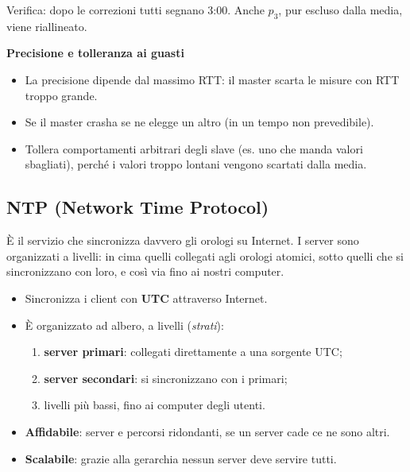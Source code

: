 Verifica: dopo le correzioni tutti segnano 3:00. Anche \(p_3\), pur escluso dalla media, viene riallineato.

\textbf{Precisione e tolleranza ai guasti}

\begin{itemize}
\tightlist
\item
  La precisione dipende dal massimo RTT: il master scarta le misure con RTT troppo grande.
\item
  Se il master crasha se ne elegge un altro (in un tempo non prevedibile).
\item
  Tollera comportamenti arbitrari degli slave (es. uno che manda valori sbagliati), perché i valori troppo lontani vengono scartati dalla media.
\end{itemize}

\subsection{NTP (Network Time Protocol)}

\begin{inbreve}

È il servizio che sincronizza davvero gli orologi su Internet. I server sono organizzati a livelli: in cima quelli collegati agli orologi atomici, sotto quelli che si sincronizzano con loro, e così via fino ai nostri computer.

\end{inbreve}

\begin{itemize}
\tightlist
\item
  Sincronizza i client con \textbf{UTC} attraverso Internet.
\item
  È organizzato ad albero, a livelli (\emph{strati}):

  \begin{enumerate}
  \def\labelenumi{\arabic{enumi}.}
  \tightlist
  \item
    \textbf{server primari}: collegati direttamente a una sorgente UTC;
  \item
    \textbf{server secondari}: si sincronizzano con i primari;
  \item
    livelli più bassi, fino ai computer degli utenti.
  \end{enumerate}
\item
  \textbf{Affidabile}: server e percorsi ridondanti, se un server cade ce ne sono altri.
\item
  \textbf{Scalabile}: grazie alla gerarchia nessun server deve servire tutti.
\end{itemize}

